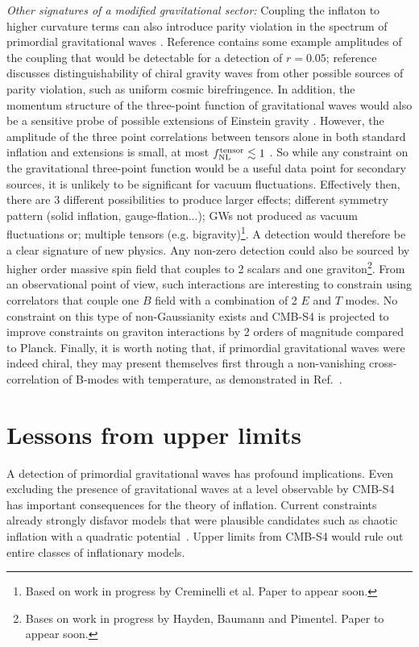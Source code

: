 {\it Other signatures of a modified gravitational sector:} Coupling the inflaton to higher curvature terms can also introduce parity violation in the spectrum of primordial gravitational waves \cite{lue99,Alexander:2004wk,Contaldi:2008yz,Takahashi:2009wc}. Reference \cite{Takahashi:2009wc} contains some example amplitudes of the coupling that would be detectable for a detection of $r=0.05$; reference \cite{2010PhRvD..81l3529G} discusses distinguishability of chiral gravity waves from other possible sources of parity violation, such as uniform cosmic birefringence. In addition, the momentum structure of the three-point function of gravitational waves would also be a sensitive probe of possible extensions of Einstein gravity \cite{Maldacena:2011nz}. However, the amplitude of the three point correlations between tensors alone in both standard inflation and extensions is small, at most $f^{\rm tensor}_{\rm NL}\lesssim 1$ \cite{Maldacena:2002vr,Maldacena:2011nz}. So while any constraint on the gravitational three-point function would be a useful data point for secondary sources, it is unlikely to be significant for vacuum fluctuations. Effectively then, there are 3 different possibilities to produce larger effects; different symmetry pattern (solid inflation, gauge-flation...); GWs not produced as vacuum fluctuations or; multiple tensors (e.g. bigravity)\footnote{Based on work in progress by Creminelli et al. Paper to appear soon. }. A detection would therefore be a clear signature of new physics. Any non-zero detection could also be sourced by higher order massive spin field that couples to 2 scalars and one graviton\footnote{Bases on work in progress by Hayden, Baumann and Pimentel. Paper to appear soon.}. From an observational point of view, such interactions are interesting to constrain using correlators that couple one $B$ field with a combination of 2 $E$ and $T$ modes. No constraint on this type of non-Gaussianity exists and CMB-S4 is projected to improve constraints on graviton interactions by 2 orders of magnitude \cite{Meerburg2016} compared to Planck. 
Finally, it is worth noting that, if primordial gravitational waves were indeed chiral, they may present themselves first through a non-vanishing cross-correlation of B-modes with temperature, as demonstrated in Ref.~\cite{Contaldi:2008yz}.


\section{Lessons from upper limits} 
\label{sec:upperLimits}
A detection of primordial gravitational waves has profound implications. Even excluding the presence of gravitational waves at a level observable by CMB-S4 has important consequences for the theory of inflation. Current constraints already strongly disfavor models that were plausible candidates such as chaotic inflation with a quadratic potential~\cite{bicepkeckplanck15}. Upper limits from CMB-S4 would rule out entire classes of inflationary models. 

